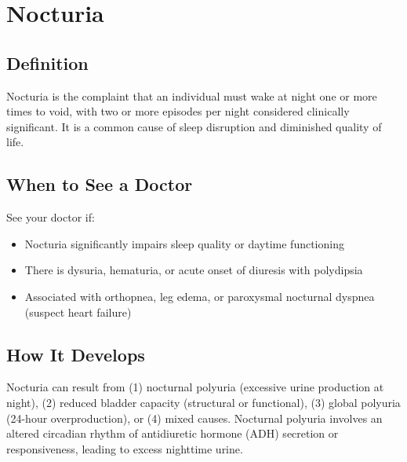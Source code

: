 \chapter{Nocturia}

\section*{Definition}
Nocturia is the complaint that an individual must wake at night one or more times to void, with two or more episodes per night considered clinically significant. It is a common cause of sleep disruption and diminished quality of life.

\section*{When to See a Doctor}
See your doctor if:
\begin{itemize}
  \item Nocturia significantly impairs sleep quality or daytime functioning
  \item There is dysuria, hematuria, or acute onset of diuresis with polydipsia
  \item Associated with orthopnea, leg edema, or paroxysmal nocturnal dyspnea (suspect heart failure)
\end{itemize}

\section*{How It Develops}
Nocturia can result from (1) nocturnal polyuria (excessive urine production at night), (2) reduced bladder capacity (structural or functional), (3) global polyuria (24-hour overproduction), or (4) mixed causes. Nocturnal polyuria involves an altered circadian rhythm of antidiuretic hormone (ADH) secretion or responsiveness, leading to excess nighttime urine.

